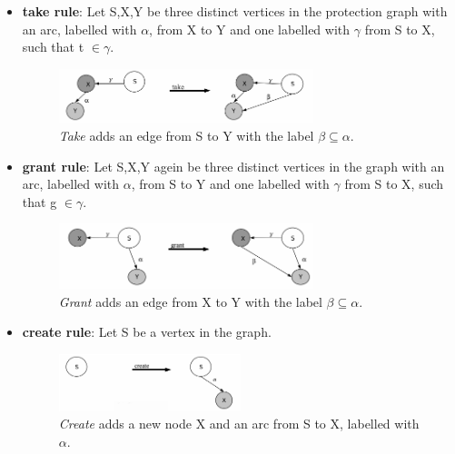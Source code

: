 \begin{itemize}
\item \textbf{take rule}: Let S,X,Y be three distinct vertices in the protection graph with an arc, labelled with $\alpha$, from X to Y and one labelled with $\gamma$ from S to X, such that t $\in \gamma.$  
\begin{figure}[ht]
\centering
	\includegraphics[width=0.7\textwidth]{./Pictures/takeRule.png}
	\caption[take rule]{\textit{Take} adds an edge from S to Y with the label $\beta \subseteq \alpha$. \cite{TakeG}}
	\label{fig:cltake}
\end{figure}	
	
\item \textbf{grant rule}:	Let S,X,Y agein be three distinct vertices in the graph with an arc, labelled with  $\alpha$, from S to Y and one labelled with $\gamma$ from S to X, such that g $\in \gamma$. 
\begin{figure}[ht]
\centering
	\includegraphics[width=0.7\textwidth]{./Pictures/grantRule.png}
	\caption[grant rule]{\textit{Grant} adds an edge from X to Y with the label $\beta \subseteq \alpha$.  \cite{TakeG}}
	\label{fig:clgrant}
\end{figure}	
	
\item \textbf{create rule}: Let S be a vertex in the graph. 
\begin{figure}[H]
\centering
	\includegraphics[width=0.5\textwidth]{./Pictures/createRule.png}
	\caption[create rule]{\textit{Create} adds a new node X and an arc from S to X, labelled with $\alpha$. \cite{TakeG}}
	\label{fig:clcreate}
\end{figure}	


\end{itemize}
